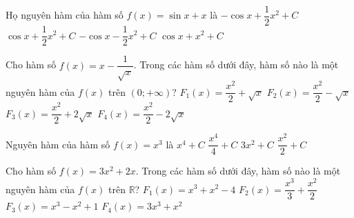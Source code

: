 \begin{ex}%
	 Họ nguyên hàm của hàm số $f(x)=\sin x+x$ là
	\choice 
		{\True $-\cos  x+\dfrac{1}{2}x^2+C$}
		{$\cos x+\dfrac{1}{2}x^2+C$} 
		 {$-\cos x-\dfrac{1}{2}x^2+C$}
		 {$\cos x+x^2+C$}
\end{ex}

\begin{ex}%
	Cho hàm số $f(x)=x-\dfrac{1}{\sqrt{x}}$. Trong các hàm số dưới đây, hàm số nào  là một nguyên hàm của $f(x)$ trên $(0;+\infty)$?
	\choice 
		 {$F_1(x)=\dfrac{x^2}{2}+\sqrt{x}$}
		 {$F_2(x)=\dfrac{x^2}{2}-\sqrt{x}$}
		{$F_3(x)=\dfrac{x^2}{2}+2\sqrt{x}$} 
		{\True $F_4(x)=\dfrac{x^2}{2}-2\sqrt{x}$} 
\end{ex}

\begin{ex}%
	 Nguyên hàm của hàm số $f(x)=x^3$ là
	\choice 
		{$x^4+C$} 
		{\True $\dfrac{x^4}{4}+C$} 
		 {$3x^2+C$}
		 {$\dfrac{x^2}{2}+C$}
\end{ex}

\begin{ex}%
	Cho hàm số $f(x)=3x^2+2x$. Trong các hàm số dưới đây, hàm số nào là một  nguyên hàm của $f(x)$ trên $\mathbb{R}$?
	\choice 
		 {\True $F_1(x)=x^3+x^2-4$}
		 {$F_2(x)=\dfrac{x^3}{3}+\dfrac{x^2}{2}$}
		{$F_3(x)=x^3-x^2+1$} 
		 {$F_4(x)=3x^3+x^2$}
\end{ex}


